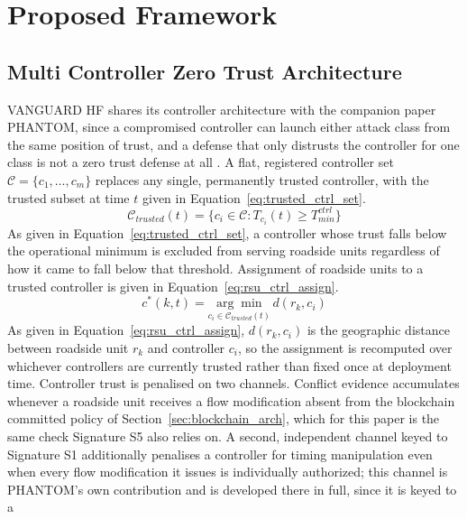 \documentclass[final,5p,twocolumn]{elsarticle}
\theoremstyle{remark}
\theoremstyle{plain}
\begin{document}
\section{Proposed Framework}
\label{sec:framework}

\subsection{Multi Controller Zero Trust Architecture}
\label{sec:ctrl_trust}

VANGUARD HF shares its controller architecture with the companion paper
PHANTOM, since a compromised controller can launch either attack class from
the same position of trust, and a defense that only distrusts the controller
for one class is not a zero trust defense at all \cite{Phantom2026}. A flat,
registered controller set $\mathcal{C} = \{c_1, \ldots, c_m\}$ replaces any
single, permanently trusted controller, with the trusted subset at time $t$
given in Equation~\eqref{eq:trusted_ctrl_set}.
\begin{equation}
	\mathcal{C}_{trusted}(t) = \{c_i \in \mathcal{C} : T_{c_i}(t) \geq T_{min}^{ctrl}\}
	\label{eq:trusted_ctrl_set}
\end{equation}
As given in Equation~\eqref{eq:trusted_ctrl_set}, a controller whose trust
falls below the operational minimum is excluded from serving roadside units
regardless of how it came to fall below that threshold. Assignment of
roadside units to a trusted controller is given in
Equation~\eqref{eq:rsu_ctrl_assign}.
\begin{equation}
	c^*(k,t) = \underset{c_i \in \mathcal{C}_{trusted}(t)}{\arg\min}\, d(r_k, c_i)
	\label{eq:rsu_ctrl_assign}
\end{equation}
As given in Equation~\eqref{eq:rsu_ctrl_assign}, $d(r_k,c_i)$ is the
geographic distance between roadside unit $r_k$ and controller $c_i$, so
the assignment is recomputed over whichever controllers are currently
trusted rather than fixed once at deployment time. Controller trust is penalised on two channels. Conflict evidence
accumulates whenever a roadside unit receives a flow modification absent
from the blockchain committed policy of Section~\ref{sec:blockchain_arch},
which for this paper is the same check Signature S5 also relies on. A
second, independent channel keyed to Signature S1 additionally penalises a
controller for timing manipulation even when every flow modification it
issues is individually authorized; this channel is PHANTOM's own
contribution and is developed there in full, since it is keyed to a
\end{document}
